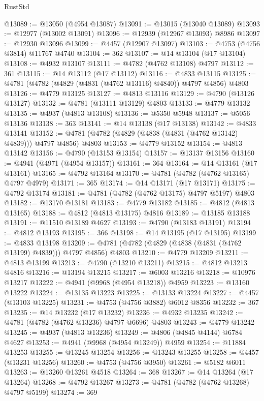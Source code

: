 \begin{lexlean}{RustStd}
\begin{coremodule}
@13089 := @13050 (@4954 @13087)
@13091 := @13015 (@13040 @13089)
@13093 := @12977 (@13002 @13091)
@13096 := @12939 (@12967 @13093) @8986
@13097 := @12930 @13096
@13099 := @4457 (@12907 @13097)
@13103 := @4753 (@4756 @3814) @11767 @4740
@13104 := 362
@13107 := @14 @13104 (@17 @13104)
@13108 := @4932 @13107
@13111 := @4782 (@4762 @13108) @4797
@13112 := 361
@13115 := @14 @13112 (@17 @13112)
@13116 := @4833 @13115
@13125 := @4781 (@4782 (@4829 (@4831 (@4762 @13116) @4840)) @4797 @4856) @4803
@13126 := @4779 @13125
@13127 := @4813 @13116
@13129 := @4790 (@13126 @13127)
@13132 := @4781 (@13111 @13129) @4803
@13133 := @4779 @13132
@13135 := @4937 (@4813 @13108)
@13136 := @5350 @5948
@13137 := @5056 @13136
@13138 := 363
@13141 := @14 @13138 (@17 @13138)
@13142 := @4833 @13141
@13152 := @4781 (@4782 (@4829 (@4838 (@4831 (@4762 @13142) @4839))) @4797 @4856) @4803
@13153 := @4779 @13152
@13154 := @4813 @13142
@13156 := @4790 (@13153 @13154)
@13157 := @13137 @13156
@13160 := @4941 (@4971 (@4954 @13157))
@13161 := 364
@13164 := @14 @13161 (@17 @13161)
@13165 := @4792 @13164
@13170 := @4781 (@4782 (@4762 @13165) @4797 @4979)
@13171 := 365
@13174 := @14 @13171 (@17 @13171)
@13175 := @4792 @13174
@13181 := @4781 (@4782 (@4762 @13175) @4797 @5197) @4803
@13182 := @13170 @13181
@13183 := @4779 @13182
@13185 := @4812 (@4813 @13165)
@13188 := @4812 (@4813 @13175) @4816
@13189 := @13185 @13188
@13191 := @11510 @13189 @4627
@13193 := @4790 (@13183 @13191)
@13194 := @4812 @13193
@13195 := 366
@13198 := @14 @13195 (@17 @13195)
@13199 := @4833 @13198
@13209 := @4781 (@4782 (@4829 (@4838 (@4831 (@4762 @13199) @4839))) @4797 @4856) @4803
@13210 := @4779 @13209
@13211 := @4813 @13199
@13213 := @4790 (@13210 @13211)
@13215 := @4812 @13213 @4816
@13216 := @13194 @13215
@13217 := @6003 @13216
@13218 := @10976 @13217
@13222 := @4941 (@9968 (@4954 @13218)) @4959
@13223 := @13160 @13222
@13224 := @13135 @13223
@13225 := @13133 @13224
@13227 := @4457 (@13103 @13225)
@13231 := @4753 (@4756 @3882) @6012 @8356
@13232 := 367
@13235 := @14 @13232 (@17 @13232)
@13236 := @4932 @13235
@13242 := @4781 (@4782 (@4762 @13236) @4797 @6696) @4803
@13243 := @4779 @13242
@13245 := @4937 (@4813 @13236)
@13249 := @4806 (@4845 @4144) @6784 @4627
@13253 := @4941 (@9968 (@4954 @13249)) @4959
@13254 := @11884 @13253
@13255 := @13245 @13254
@13256 := @13243 @13255
@13258 := @4457 (@13231 @13256)
@13260 := @4753 (@4756 @3950)
@13261 := @5182 @6011
@13263 := @13260 @13261 @4518
@13264 := 368
@13267 := @14 @13264 (@17 @13264)
@13268 := @4792 @13267
@13273 := @4781 (@4782 (@4762 @13268) @4797 @5199)
@13274 := 369

\end{coremodule}
\end{lexlean}
